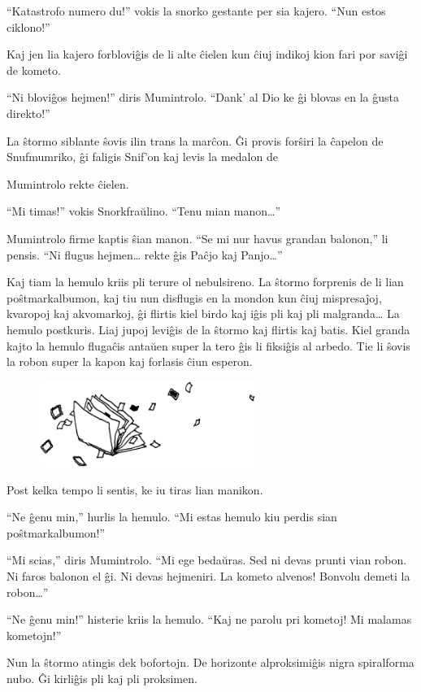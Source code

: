 ``Katastrofo numero du!'' vokis la snorko gestante per sia kajero. ``Nun estos ciklono!''

Kaj jen lia kajero forbloviĝis de li alte ĉielen kun ĉiuj indikoj kion fari por saviĝi de kometo.

``Ni bloviĝos hejmen!'' diris Mumintrolo. ``Dank' al Dio ke ĝi blovas en la ĝusta direkto!''

La ŝtormo siblante ŝovis ilin trans la marĉon. Ĝi provis forŝiri la ĉapelon de Snufmumriko, ĝi faligis Snif'on kaj levis la medalon de

Mumintrolo rekte ĉielen.

``Mi timas!'' vokis Snorkfraŭlino. ``Tenu mian manon{\ldots}''

Mumintrolo firme kaptis ŝian manon. ``Se mi nur havus grandan balonon,'' li pensis. ``Ni flugus hejmen{\ldots} rekte ĝis Paĉjo kaj Panjo{\ldots}''

Kaj tiam la hemulo kriis pli terure ol nebulsireno. La ŝtormo forprenis de li lian poŝtmarkalbumon, kaj tiu nun disflugis en la mondon kun ĉiuj mispresaĵoj, kvaropoj kaj akvomarkoj, ĝi flirtis kiel birdo kaj iĝis pli kaj pli malgranda{\ldots} La hemulo postkuris. Liaj jupoj leviĝis de la ŝtormo kaj flirtis kaj batis. Kiel granda kajto la hemulo flugaĉis antaŭen super la tero ĝis li fiksiĝis al arbedo. Tie li ŝovis la robon super la kapon kaj forlasis ĉiun esperon.

\begin{figure}[htbp]
\centering
\includegraphics[width=200pt,height=79pt]{8-7.png}
\caption{}
\label{8-7}
\end{figure}

Post kelka tempo li sentis, ke iu tiras lian manikon.

``Ne ĝenu min,'' hurlis la hemulo. ``Mi estas hemulo kiu perdis sian poŝtmarkalbumon!''

``Mi scias,'' diris Mumintrolo. ``Mi ege bedaŭras. Sed ni devas prunti vian robon. Ni faros balonon el ĝi. Ni devas hejmeniri. La kometo alvenos! Bonvolu demeti la robon{\ldots}''

``Ne ĝenu min!'' histerie kriis la hemulo. ``Kaj ne parolu pri kometoj! Mi malamas kometojn!''

Nun la ŝtormo atingis dek bofortojn. De horizonte alproksimiĝis nigra spiralforma nubo. Ĝi kirliĝis pli kaj pli proksimen.

